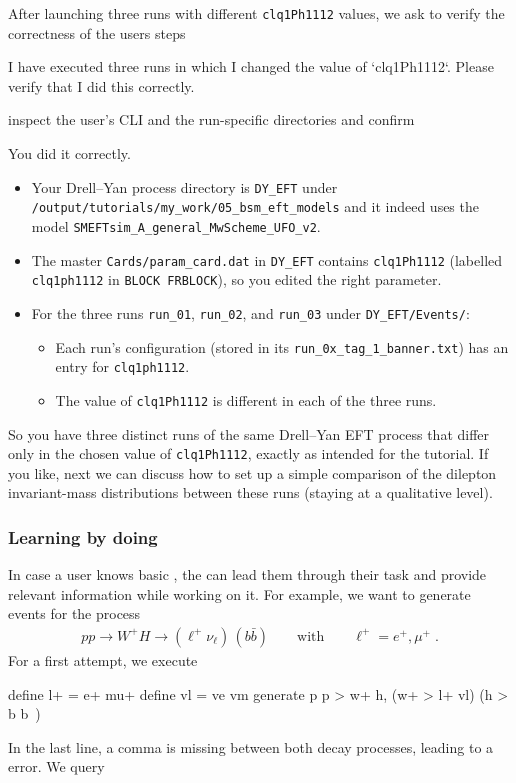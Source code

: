 \documentclass[submission, Phys]{SciPost}
\begin{document}
%
After launching three \mg runs with different \lstinline|clq1Ph1112| values, we ask \ma to verify the correctness of the users steps
%
\begin{userblock}[User]
I have executed three runs in which I changed the value of `clq1Ph1112`. Please verify that I did this correctly.    
\end{userblock}
%
\ma inspect the user's CLI and the run-specific directories and confirm
%
\begin{promptblock}[\ma]
You did it correctly.

\begin{itemize}
\item Your Drell--Yan process directory is \lstinline|DY_EFT| under \lstinline|/output/tutorials/my_work/05_bsm_eft_models| and it indeed uses the model \lstinline|SMEFTsim_A_general_MwScheme_UFO_v2|.
\item The master \lstinline|Cards/param_card.dat| in \lstinline|DY_EFT| contains \lstinline|clq1Ph1112| (labelled \lstinline|clq1ph1112| in \lstinline|BLOCK FRBLOCK|), so you edited the right parameter.
\item For the three runs \lstinline|run_01|, \lstinline|run_02|, and \lstinline|run_03| under \lstinline|DY_EFT/Events/|:
\begin{itemize}
\item Each run’s configuration (stored in its \lstinline|run_0x_tag_1_banner.txt|) has an entry for \lstinline|clq1ph1112|.
\item The value of \lstinline|clq1Ph1112| is different in each of the three runs.
\end{itemize}
\end{itemize}

So you have three distinct runs of the same Drell--Yan EFT process that differ only in the chosen value of \lstinline|clq1Ph1112|, exactly as intended for the tutorial. If you like, next we can discuss how to set up a simple comparison of the dilepton invariant-mass distributions between these runs (staying at a qualitative level).
\end{promptblock}

\subsubsection{Learning by doing}
\label{sec:apps_train_learn}

In case a user knows basic \mg, the \ma can lead them through their task and provide relevant information while working on it. For example, we want to generate events for the process
%
\begin{align}
    p p \to W^+ H 
    \to (\ell^+ \nu_\ell) \, (b \bar{b}) 
    \qquad \text{with} \qquad 
    \ell^+ = e^+, \mu^+ \; .
\end{align}
%
For a first \mg attempt, we execute
%
\begin{bashblock}
define l+ = e+ mu+
define vl = ve vm
generate p p > w+ h, (w+ > l+ vl) (h > b b~)
\end{bashblock}
%
In the last line, a comma is missing between both decay processes, leading to a \mg error. We query \ma
\end{document}

